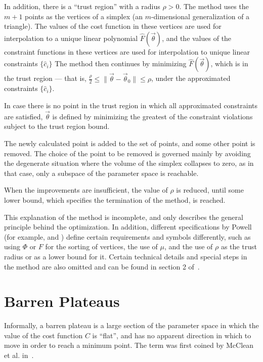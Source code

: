 \documentclass[a4paper,12pt]{article}
\newcommand{\thetas}{\vec{\theta}}
\begin{document}
In addition, there is a ``trust region'' with a radius $\rho>0$. The method uses the $m+1$ points as the vertices of a simplex (an $m$-dimensional generalization of a triangle).
The values of the cost function in these vertices are used for interpolation to a unique linear polynomial $\hat{F}(\thetas)$, and the values of the constraint functions in these vertices are used for interpolation to unique linear constraints $\{\hat{c}_i\}$
The method then continues by minimizing $\hat{F}(\thetas)$, which is in the trust region --- that is, $\frac{\rho}{2} \leq \|\thetas - \thetas_0\| \leq \rho$, under the approximated constraints $\{\hat{c}_i\}$.

In case there is no point in the trust region in which all approximated constraints are satisfied, $\thetas$ is defined by minimizing the greatest of the constraint violations subject to the trust region bound.

The newly calculated point is added to the set of points, and some other point is removed.
The choice of the point to be removed is governed mainly by avoiding the degenerate situation where the volume of the simplex collapses to zero, as in that case, only a subspace of the parameter space is reachable.

When the improvements are insufficient, the value of $\rho$ is reduced, until some lower bound, which specifies the termination of the method, is reached.

This explanation of the method is incomplete, and only describes the general principle behind the optimization. In addition, different specifications by Powell (for example, \cite{Powell1994} and \cite{powell_view_2007}) define certain requirements and symbols differently, such as using $\Phi$ or $F$ for the sorting of vertices, the use of $\mu$, and the use of $\rho$ as the trust radius or as a lower bound for it.
Certain technical details and special steps in the method are also omitted and can be found in section 2 of~\cite{Powell1994}.


\section{Barren Plateaus} \label{sec:bps}
Informally, a barren plateau is a large section of the parameter space in which the value of the cost function $C$ is ``flat'', and has no apparent direction in which to move in order to reach a minimum point. The term was first coined by McClean et al. in~\cite{mcclean_barren_2018}.
\end{document}
